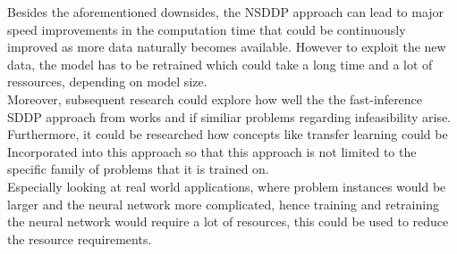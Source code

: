 Besides the aforementioned downsides, the NSDDP approach can lead to major speed improvements in the computation time that could be continuously improved as more data naturally becomes available.
However to exploit the new data, the model has to be retrained which could take a long time and a lot of ressources, depending on model size. \\
Moreover, subsequent research could explore how well the the fast-inference SDDP approach from \cite{NSDDP} works and if similiar problems regarding infeasibility arise.
Furthermore, it could be researched how concepts like transfer learning could be Incorporated into this approach so that this approach is not limited to the specific family of problems that it is trained on. \\
Especially looking at real world applications, where problem instances would be larger and the neural network more complicated, hence training and retraining the neural network would require a lot of resources, this could be used to reduce the resource requirements.

